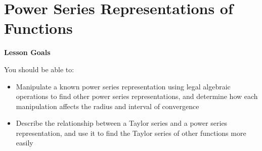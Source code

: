 \documentclass[main]{subfiles}
\begin{document}
\ifSubfilesClassLoaded{%
  \chaptermark{\chaptertwo}
}{}

\section{Power Series Representations of Functions} \label{ws2-12}
\begin{framed}
\centerline{\textbf{Lesson Goals}}

You should be able to:
\begin{itemize}
\item Manipulate a known power series representation using legal algebraic operations to find other power series representations, and determine how each manipulation affects the radius and interval of convergence
\item Describe the relationship between a Taylor series and a power series representation, and use it to find the Taylor series of other functions more easily
\end{itemize}
\end{framed}
\end{document}
